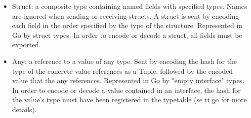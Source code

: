 \begin{itemize}
	\item Struct: a composite type containing named fields with specified types. Names are ignored when sending or receiving structs. A struct is sent by encoding each field in the order specified by the type of the structure. Represented in Go by struct types. In order to encode or decode a struct, all fields must be exported.
	
	\item Any: a reference to a value of any type. Sent by encoding the hash for the type of the concrete value references as a Tuple, followed by the encoded value that the any references. Represented in Go by "empty interface" types. In order to encode or decode a value contained in an interface, the hash for the value's type must have been registered in the typetable (se tt.go for more details).

\end{itemize}
